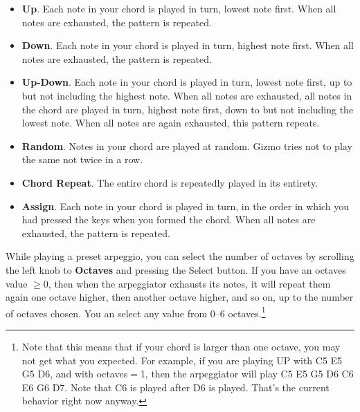 \documentclass{article}
\begin{document}
\begin{itemize}
\item {\bf Up}.  Each note in your chord is played in turn, lowest note first.  When all notes are exhausted, the pattern is repeated.
\item {\bf Down}.  Each note in your chord is played in turn, highest note first.  When all notes are exhausted, the pattern is repeated.
\item {\bf Up-Down}.  Each note in your chord is played in turn, lowest note first, up to but not including the highest note.  When all notes are exhausted, all notes in the chord are played in turn, highest note first, down to but not including the lowest note.  When all notes are again exhausted, this pattern repeats.

\item {\bf Random}.  Notes in your chord are played at random.  Gizmo tries not to play the same not twice in a row.
\item {\bf Chord Repeat}.  The entire chord is repeatedly played in its entirety.
\item {\bf Assign}. Each note in your chord is played in turn, in the order in which you had pressed the keys when you formed the chord.  When all notes are exhausted, the pattern is repeated.
\end{itemize}

While playing a preset arpeggio, you can select the number of octaves by scrolling the left knob to {\bf Octaves} and pressing the Select button.  If you have an octaves value \(\geq 0\), then when the arpeggiator exhausts its notes, it will repeat them again one octave higher, then another octave higher, and so on, up to the number of octaves chosen. You an select any value from 0--6 octaves.\footnote{Note that this means that if your chord is larger than one octave, you may not get what you expected.  For example, if you are playing UP with C5 E5 G5 D6, and with octaves\(=\)1, then the arpeggiator will play C5 E5 G5 D6 C6 E6 G6 D7.  Note that C6 is played after D6 is played.  That's the current behavior right now anyway.}
\end{document}
